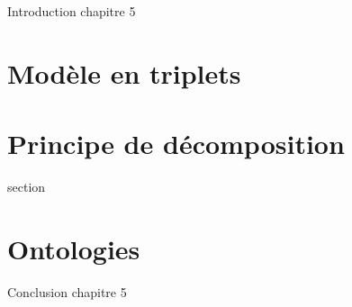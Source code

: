 %

\chaptertoc{}

\label{sec:5-int}

Introduction chapitre 5

\section{Modèle en triplets}
\label{sec:5-1}

\section{Principe de décomposition}
\label{sec:5-2}
{section}

\section{Ontologies}
\label{sec:5-3}

\label{sec:5-cnc}

Conclusion chapitre 5
